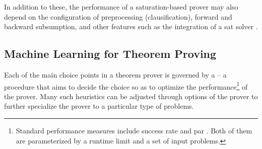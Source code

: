 In addition to these, the performance of a saturation-based prover may also depend on the configuration of preprocessing (clausification), forward and backward subsumption, and other features such as the integration of a \gls{sat} solver \cite{DBLP:conf/cav/Voronkov14}.


\subsection{Machine Learning for Theorem Proving}




Each of the main choice points in a theorem prover is governed by a  -- a procedure that aims to decide the choice so as to optimize the performance\footnote{Standard performance measures include success rate and \gls{par} \cite{DBLP:journals/ai/BischlKKLMFHHLT16}. Both of them are parameterized by a runtime limit and a set of input problems.} of the prover.
Many such heuristics can be adjusted through options of the prover to further specialize the prover to a particular type of problems.

